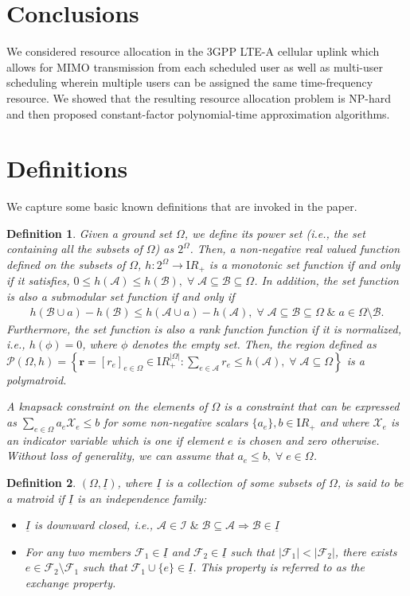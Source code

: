 \documentclass[11pt] {article}
\newcommand{\Reals}     {{{\mathrm I\!R}}}  \newcommand{\Cplx}      {{{\mathsf I}\!\!\!{\mathrm C}}} \newcommand{\NCplx}     {{{\mathcal{CN}}}} \newcommand{\Ints}      {{{\mathbb Z}}} \newcommand{\Rats}      {{{\mathsf I}\!\!\!{\mathrm Q}}}    \newcommand{\Nats}      {{{\mathrm{ I\!N}}}} \newcommand{\Tee}{      {{\mathbb T}}}
\newcommand{\uwti}[1]{{\mathbf #1}}
\newcommand{\rb}{{\uwti r}}  \newcommand{\Rb}{{\uwti R}}
\newcommand{\Ac} {{\mathcal A}}         \newcommand{\Ak} {{\bm {\mathcal A}}}
\newcommand{\Bc} {{\mathcal B}}         \newcommand{\Bk} {{\bm {\mathcal B}}}
\newcommand{\Fc} {{\mathcal F}}         \newcommand{\Fk} {{\bm {\mathcal F}}}
\newcommand{\Ic} {{\mathcal I}}         \newcommand{\Ik} {{\bm {\mathcal I}}}
\newcommand{\Pc} {{\mathcal P}}         \newcommand{\Pk} {{\bm {\mathcal P}}}
\newcommand{\Xc} {{\mathcal X}}         \newcommand{\Xk} {{\bm {\mathcal X}}}
\newcommand{\Iul}  {{\underline I}}              \newcommand{\iul}  {{\underline i}}
\newtheorem{definition}{Definition}
\begin{document}
\section{Conclusions}
We considered resource allocation in the 3GPP LTE-A  cellular uplink which allows for MIMO transmission from each scheduled user as well as multi-user  scheduling wherein multiple users can be assigned the same time-frequency resource.  We showed that the resulting resource allocation problem is NP-hard and then   proposed constant-factor polynomial-time   approximation  algorithms.


\appendix

\section{Definitions}\label{app:defns}
We capture some basic known definitions that are invoked in the paper.
\begin{definition}
Given a ground set $\Omega$, we define its power set  (i.e., the set containing all the subsets of  $\Omega$) as $2^{\Omega}$. Then,
a non-negative real valued function defined on the subsets of $\Omega$,
$h:2^{\Omega}\to\Reals_+$ is a {\em monotonic} set function if and only if it satisfies, $0\leq h(\Ac)\leq h(\Bc),\;\forall\;\Ac\subseteq\Bc\subseteq\Omega$. In addition,
the set function is also a
{\em submodular} set function if and only if
\begin{eqnarray}\label{eq:submoddef}
h(\Bc\cup a)-h(\Bc)\leq h(\Ac\cup a)-h(\Ac),\;\forall\;\Ac\subseteq\Bc\subseteq\Omega\;\&\;a\in\Omega\setminus\Bc.
\end{eqnarray}
Furthermore,  the set function is also a
 {\em rank} function function if it is normalized, i.e., $h(\phi)=0$, where $\phi$ denotes the empty set.
 Then, the region defined as $\Pc(\Omega,h)=\left\{\rb=[r_e]_{e\in\Omega}\in\Reals_+^{|\Omega|}: \sum_{e\in\Ac}r_{e}\leq h(\Ac),\;\forall\;\Ac\subseteq\Omega \right\}$ is a {\em polymatroid}.

A {\em knapsack constraint} on the elements of $\Omega$ is a constraint that can be expressed as
 $\sum_{e\in\Omega}a_e\Xc_e\leq b$ for some non-negative scalars $\{a_e\},b\in\Reals_+$ and where $\Xc_e$ is an indicator variable which is one if element $e$ is chosen and zero otherwise. Without loss of generality, we can assume that $a_e\leq b,\;\forall\;e\in\Omega$.
 \end{definition}
\begin{definition}
  $(\Omega,\Iul)$, where $\Iul$ is a collection of some subsets of $\Omega$, is said to be a {\em matroid} if $\Iul$ is an {\em independence family}:
  \begin{itemize}
 \item $\Iul$ is downward closed, i.e., $\Ac\in\Ic\;\&\;\Bc\subseteq\Ac\Rightarrow\Bc\in\Iul$
  \item For any two members $\Fc_1\in\Iul$ and $\Fc_2\in\Iul$ such that $|\Fc_1|<|\Fc_2|$, there exists
   $e\in\Fc_2\setminus\Fc_1$ such that $\Fc_1\cup\{e\}\in\Iul$. This property is referred to as the exchange property.
\end{itemize}
\end{definition}
\end{document}
